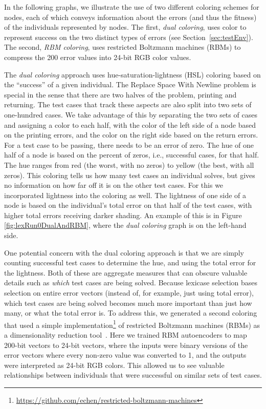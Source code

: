 \documentclass{sig-alternate}
\begin{document}
In the following graphs, we illustrate the use of two different coloring 
schemes for nodes, each of which conveys information about the errors 
(and thus the fitness) of the individuals represented by nodes. 
The first, \emph{dual coloring}, uses color to represent success on the 
two distinct types of errors (see Section~\ref{sec:testEnv}). The second,
\emph{RBM coloring}, uses restricted Boltzmann machines (RBMs) to compress
the 200 error values into 24-bit RGB color values.

The \emph{dual coloring} approach uses hue-saturation-lightness (HSL) coloring
based on the ``success'' of a given individual. 
The Replace Space With Newline problem is special in the sense that there are 
two halves of the problem, printing and returning. The test cases that track 
these aspects are also split into two sets of one-hundred cases. We take 
advantage of this by separating the two sets of cases and assigning a color 
to each half, with the color of the left side of a node based on the
printing errors, and the color on the right side based on the return errors.
For a test case to be passing, there needs to be an error of zero. 
The hue of one half of a node is based on the percent of zeros, i.e., 
successful cases, for that half. The hue ranges from red (the worst, with no zeros) to yellow (the best, with all zeros). This coloring tells us how many test cases an individual solves, but gives no information on how far off it is on the other test cases. For this we incorporated lightness into the coloring as well. The lightness of one side of a node is based on the individual's total error on that half of the test cases, with higher total errors receiving darker shading. An example of this is in Figure \ref{fig:lexRun0DualAndRBM}, where the \textit{dual coloring} graph is on the left-hand side.

One potential concern with the dual coloring approach is that we are simply 
counting successful test cases to determine the hue, and using the total
error for the lightness. Both of these are aggregate measures that can obscure
valuable details such as \emph{which} test cases are being solved. Because
lexicase selection bases selection on entire error vectors (instead of, for example,
just using total error), which test cases are being solved becomes much more
important than just how many, or what the total error is. To address this, we
generated a second coloring that used a simple 
implementation\footnote{\url{https://github.com/echen/restricted-boltzmann-machines}} 
of restricted Boltzmann machines (RBMs) as a dimensionality reduction 
tool~\cite{hinton2006reducing}. Here we trained RBM autoencoders to map 200-bit
vectors to 24-bit vectors, where the inputs were binary versions of the error
vectors where every non-zero value was converted to 1, and the outputs were
interpreted as 24-bit RGB colors. This allowed us to see valuable relationships
between individuals that were successful on similar sets of test cases. 
\end{document}

